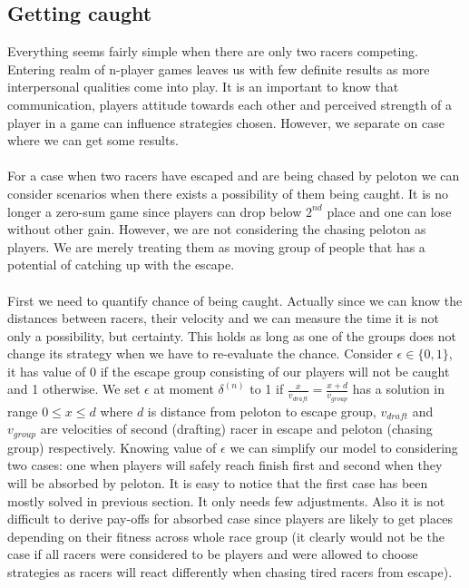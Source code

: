 \documentclass[10pt, a4paper]{report}
\begin{document}
\subsection{Getting caught}\label{subsec:getcaught}
Everything seems fairly simple when there are only two racers competing. Entering realm of n-player games leaves us with few definite results as more interpersonal qualities come into play. It is an important to know that communication, players attitude towards each other and perceived strength of a player in a game can influence strategies chosen. However, we separate on case where we can get some results.
\\\\
For a case when two racers have escaped and are being chased by peloton we can consider scenarios when there exists a possibility of them being caught. It is no longer a zero-sum game since players can drop below $2^{nd}$ place and one can lose without other gain. However, we are not considering the chasing peloton as players. We are merely treating them as moving group of people that has a potential of catching up with the escape.
\\\\
First we need to quantify chance of being caught. Actually since we can know the distances between racers, their velocity and we can measure the time it is not only a possibility, but certainty. This holds as long as one of the groups does not change its strategy when we have to re-evaluate the chance. Consider $\epsilon \in \{0,1\}$, it has value of 0 if the escape group consisting of our players will not be caught and 1 otherwise. We set $\epsilon$ at moment $\delta^{(n)}$ to 1 if $\frac{x}{v_{draft}}=\frac{x+d}{v_{group}}$ has a solution in range $0\le x\le d$ where $d$ is distance from peloton to escape group, $v_{draft}$ and $v_{group}$ are velocities of second (drafting) racer in escape and peloton (chasing group) respectively. Knowing value of $\epsilon$ we can simplify our model to considering two cases: one when players will safely reach finish first and second when they will be absorbed by peloton. It is easy to notice that the first case has been mostly solved in previous section. It only needs few adjustments. Also it is not difficult to derive pay-offs for absorbed case since players are likely to get places depending on their fitness across whole race group (it clearly would not be the case if all racers were considered to be players and were allowed to choose strategies as racers will react differently when chasing tired racers from escape).
\end{document}
